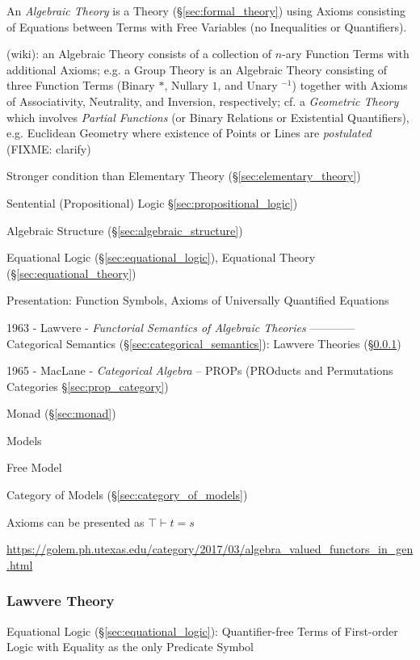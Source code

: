 An \emph{Algebraic Theory} is a Theory (\S\ref{sec:formal_theory}) using Axioms
consisting of Equations between Terms with Free Variables (no Inequalities or
Quantifiers).

(wiki): an Algebraic Theory consists of a collection of $n$-ary Function Terms
with additional Axioms; e.g. a Group Theory is an Algebraic Theory consisting of
three Function Terms (Binary $*$, Nullary $1$, and Unary $^{-1}$) together with
Axioms of Associativity, Neutrality, and Inversion, respectively; cf. a
\emph{Geometric Theory} which involves \emph{Partial Functions} (or Binary
Relations or Existential Quantifiers), e.g. Euclidean Geometry where existence
of Points or Lines are \emph{postulated} (FIXME: clarify)

Stronger condition than Elementary Theory (\S\ref{sec:elementary_theory})

Sentential (Propositional) Logic \S\ref{sec:propositional_logic})

Algebraic Structure (\S\ref{sec:algebraic_structure})

Equational Logic (\S\ref{sec:equational_logic}),
Equational Theory (\S\ref{sec:equational_theory})

Presentation: Function Symbols, Axioms of Universally Quantified Equations

1963 - Lawvere - \emph{Functorial Semantics of Algebraic Theories} ------------
Categorical Semantics (\S\ref{sec:categorical_semantics}): Lawvere Theories
(\S\ref{sec:lawvere_theory})

1965 - MacLane - \emph{Categorical Algebra} -- PROPs (PROducts and Permutations
Categories \S\ref{sec:prop_category})

Monad (\S\ref{sec:monad})

Models

Free Model

Category of Models (\S\ref{sec:category_of_models})

Axioms can be presented as $\top \vdash t = s$


\url{https://golem.ph.utexas.edu/category/2017/03/algebra_valued_functors_in_gen.html}



\subsubsection{Lawvere Theory}\label{sec:lawvere_theory}

\fist Equational Logic (\S\ref{sec:equational_logic}): Quantifier-free Terms of
First-order Logic with Equality as the only Predicate Symbol

